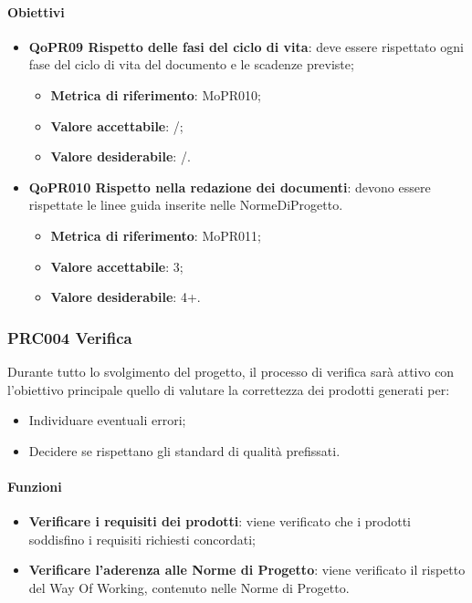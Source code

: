 \documentclass[../piano-di-qualifica.tex]{subfiles}
\begin{document}
\paragraph{Obiettivi}
\label{sub:obiettivi_3}
\begin{itemize}
    \item \textbf{QoPR09 Rispetto delle fasi del ciclo di vita}: deve essere rispettato ogni fase del ciclo di vita del documento e le scadenze previste;
        \begin{itemize}
            \item \textbf{Metrica di riferimento}: MoPR010;
            \item \textbf{Valore accettabile}: /; %
            \item \textbf{Valore desiderabile}: /.
        \end{itemize}
    \item \textbf{QoPR010 Rispetto nella redazione dei documenti}: devono essere rispettate le linee guida inserite nelle NormeDiProgetto.
        \begin{itemize}
            \item \textbf{Metrica di riferimento}: MoPR011;
            \item \textbf{Valore accettabile}: 3; %
            \item \textbf{Valore desiderabile}: 4+.
        \end{itemize}
\end{itemize}

\subsubsection{PRC004 Verifica}
\label{sub:produzione_dei_documenti}
Durante tutto lo svolgimento del progetto, il processo di verifica sarà attivo con l'obiettivo principale quello di valutare la correttezza dei prodotti generati per: 
\begin{itemize}
    \item Individuare eventuali errori;
    \item Decidere se rispettano gli standard di qualità prefissati.
\end{itemize}

\paragraph{Funzioni}
\label{sub:funzioni_4}
\begin{itemize}
    \item \textbf{Verificare i requisiti dei prodotti}: viene verificato che i prodotti soddisfino i requisiti richiesti concordati;
    \item \textbf{Verificare l'aderenza alle Norme di Progetto}: viene verificato il rispetto del Way Of Working, contenuto nelle Norme di Progetto.
\end{itemize}
\end{document}
